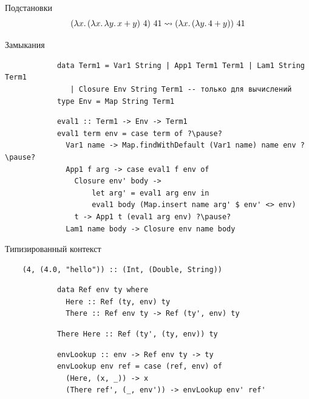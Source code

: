     \begin{frame}[fragile]{Подстановки}
        \pause
        \[
            (\lambda x\ldotp (\lambda x\ldotp \lambda y\ldotp x + y) ~ 4) ~ 41 \rightsquigarrow (\lambda x\ldotp (\lambda y\ldotp 4 + y)) ~ 41
        \]
    \end{frame}

    \begin{frame}[fragile]{Замыкания}
        \pause
        \begin{verbatim}
            data Term1 = Var1 String | App1 Term1 Term1 | Lam1 String Term1
               | Closure Env String Term1 -- только для вычислений
            type Env = Map String Term1
        \end{verbatim}
        \pause\vspace{1em}
        \begin{verbatim}
            eval1 :: Term1 -> Env -> Term1
            eval1 term env = case term of ?\pause?
              Var1 name -> Map.findWithDefault (Var1 name) name env ?\pause?
              App1 f arg -> case eval1 f env of
                Closure env' body ->
                    let arg' = eval1 arg env in
                    eval1 body (Map.insert name arg' $ env' <> env)
                t -> App1 t (eval1 arg env) ?\pause?
              Lam1 name body -> Closure env name body
        \end{verbatim}
    \end{frame}

    \begin{frame}[fragile]{Типизированный контекст}
        \pause
        \begin{verbatim}
    (4, (4.0, "hello")) :: (Int, (Double, String))
        \end{verbatim}
        \pause\vspace{1em}
        \begin{verbatim}
            data Ref env ty where
              Here :: Ref (ty, env) ty
              There :: Ref env ty -> Ref (ty', env) ty
        \end{verbatim}
        \pause\vspace{1em}
        \begin{verbatim}
            There Here :: Ref (ty', (ty, env)) ty
        \end{verbatim}
        \pause\vspace{1em}
        \begin{verbatim}
            envLookup :: env -> Ref env ty -> ty
            envLookup env ref = case (ref, env) of
              (Here, (x, _)) -> x
              (There ref', (_, env')) -> envLookup env' ref'
        \end{verbatim}
    \end{frame}

